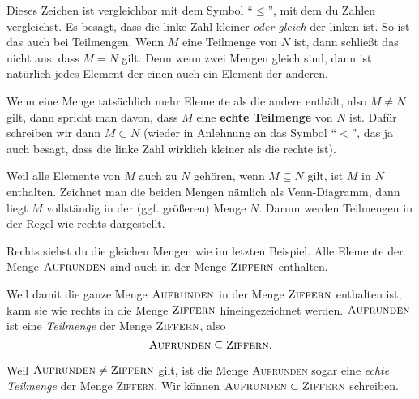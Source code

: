 \documentclass[../../main.tex]{subfiles}
\begin{document}
Dieses Zeichen ist vergleichbar mit dem Symbol \enquote{$\leq$}, mit dem du Zahlen vergleichst. Es besagt, dass die linke Zahl kleiner \emph{oder gleich} der linken ist. So ist das auch bei Teilmengen. Wenn $M$ eine Teilmenge von $N$ ist, dann schließt das nicht aus, dass $M=N$ gilt. Denn wenn zwei Mengen gleich sind, dann ist natürlich jedes Element der einen auch ein Element der anderen.

Wenn eine Menge tatsächlich mehr Elemente als die andere enthält, also $M\neq N$ gilt, dann spricht man davon, dass $M$ eine \textbf{echte Teilmenge} von $N$ ist. Dafür schreiben wir dann $M\subset N$ (wieder in Anlehnung an das Symbol \enquote{$<$}, das ja auch besagt, dass die linke Zahl wirklich kleiner als die rechte ist).

Weil alle Elemente von $M$ auch zu $N$ gehören, wenn $M\subseteq N$ gilt, ist $M$ in $N$ enthalten. Zeichnet man die beiden Mengen nämlich als Venn-Diagramm, dann liegt $M$ vollständig in der (ggf. größeren) Menge $N$. Darum werden Teilmengen in der Regel wie rechts dargestellt.

\begin{example}{}

    Rechts siehst du die gleichen Mengen wie im letzten Beispiel. Alle Elemente der Menge $\textsc{Aufrunden}$ sind auch in der Menge $\textsc{Ziffern}$ enthalten. 
    
    Weil damit die ganze Menge $\textsc{Aufrunden}$ in der Menge $\textsc{Ziffern}$ enthalten ist, kann sie wie rechts in die Menge $\textsc{Ziffern}$ hineingezeichnet werden. $\textsc{Aufrunden}$ ist eine \emph{Teilmenge} der Menge $\textsc{Ziffern}$, also
    \[\textsc{Aufrunden}\subseteq \textsc{Ziffern}.\]

    Weil $\textsc{Aufrunden}\neq \textsc{Ziffern}$ gilt, ist die Menge \textsc{Aufrunden} sogar eine \emph{echte Teilmenge} der Menge \textsc{Ziffern}. Wir können $\textsc{Aufrunden}\subset \textsc{Ziffern}$ schreiben.
\end{example}
\end{document}
